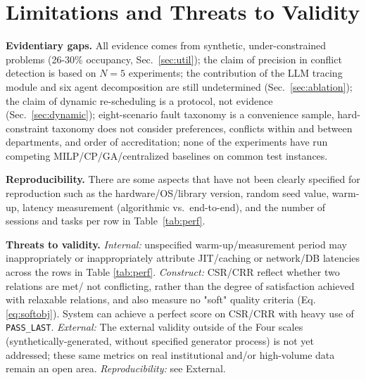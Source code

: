 \documentclass[conference]{IEEEtran}
\begin{document}
\section{Limitations and Threats to Validity}
\label{sec:limitations}
\textbf{Evidentiary gaps.} All evidence comes from synthetic, under-constrained problems (26-30\% occupancy, Sec.~\ref{sec:util}); the claim of precision in conflict detection is based on $N=5$ experiments; the contribution of the LLM tracing module and six agent decomposition are still undetermined (Sec.~\ref{sec:ablation}); the claim of dynamic re-scheduling is a protocol, not evidence (Sec.~\ref{sec:dynamic}); eight-scenario fault taxonomy is a convenience sample, hard-constraint taxonomy does not consider preferences, conflicts within and between departments, and order of accreditation; none of the experiments have run competing MILP/CP/GA/centralized baselines on common test instances.

\textbf{Reproducibility.} There are some aspects that have not been clearly specified for reproduction such as the hardware/OS/library version, random seed value, warm-up, latency measurement (algorithmic vs.\ end-to-end), and the number of sessions and tasks per row in Table~\ref{tab:perf}.

\textbf{ Threats to validity. } \textit{Internal:} unspecified warm-up/measurement period may inappropriately or inappropriately attribute JIT/caching or network/DB latencies across the rows in Table \ref{tab:perf}. \textit{Construct:} CSR/CRR reflect whether two relations are met/ not conflicting, rather than the degree of satisfaction achieved with relaxable relations, and also measure no "soft" quality criteria (Eq. \ref{eq:softobj}). System can achieve a perfect score on CSR/CRR with heavy use of \texttt{PASS\_LAST}. \textit{External:} The external validity outside of the Four scales (synthetically-generated, without specified generator process) is not yet addressed; these same metrics on real institutional and/or high-volume data remain an open area. \textit{Reproducibility:} see External.
\end{document}
